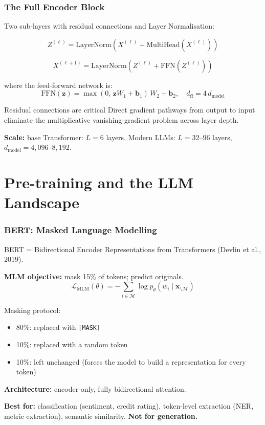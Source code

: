 \documentclass[9pt,t]{beamer}
\begin{document}
\begin{frame}
\frametitle{The Full Encoder Block}

Two sub-layers with residual connections and Layer Normalisation:

\[
Z^{(\ell)} = \text{LayerNorm}\!\left(X^{(\ell)} + \text{MultiHead}(X^{(\ell)})\right)
\]

\[
X^{(\ell+1)} = \text{LayerNorm}\!\left(Z^{(\ell)} + \text{FFN}(Z^{(\ell)})\right)
\]

where the feed-forward network is:
\[
\text{FFN}(\mathbf{z}) = \max(0,\,\mathbf{z}W_1 + \mathbf{b}_1)\,W_2 + \mathbf{b}_2,
\quad d_{\text{ff}} = 4\,d_{\text{model}}
\]

\medskip
\begin{block}{Residual connections are critical}
Direct gradient pathways from output to input eliminate the multiplicative
vanishing-gradient problem across layer depth.
\end{block}

\medskip
\textbf{Scale:} base Transformer: $L = 6$ layers.
Modern LLMs: $L = 32$--$96$ layers, $d_{\text{model}} = 4{,}096$--$8{,}192$.
\end{frame}

\section{Pre-training and the LLM Landscape}

\begin{frame}
\frametitle{BERT: Masked Language Modelling}

BERT = Bidirectional Encoder Representations from Transformers (Devlin et al., 2019).

\medskip
\textbf{MLM objective:} mask 15\% of tokens; predict originals.
\[
\mathcal{L}_{\text{MLM}}(\theta)
= -\sum_{i \in \mathcal{M}} \log p_\theta\!\left(w_i \mid \mathbf{x}_{\setminus \mathcal{M}}\right)
\]

\medskip
Masking protocol:
\begin{itemize}
  \item 80\%: replaced with \texttt{[MASK]}
  \item 10\%: replaced with a random token
  \item 10\%: left unchanged (forces the model to build a representation for every token)
\end{itemize}

\medskip
\textbf{Architecture:} encoder-only, fully bidirectional attention.

\medskip
\begin{bigpicture}
\textbf{Best for:} classification (sentiment, credit rating), token-level extraction (NER, metric
extraction), semantic similarity. \textbf{Not for generation.}
\end{bigpicture}
\end{frame}
\end{document}
